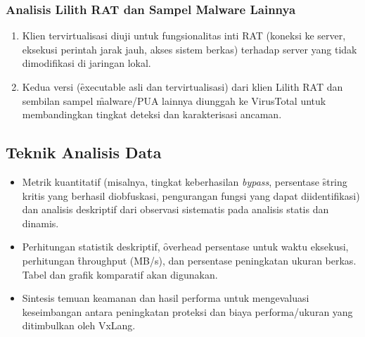 \subsubsection{Analisis Lilith RAT dan Sampel Malware Lainnya}
\begin{enumerate}
    \item {} Klien tervirtualisasi diuji untuk fungsionalitas inti RAT (koneksi ke server, eksekusi perintah jarak jauh, akses sistem berkas) terhadap server yang tidak dimodifikasi di jaringan lokal.
    \item {} Kedua versi (\f{executable} asli dan tervirtualisasi) dari klien Lilith RAT dan sembilan sampel \f{malware}/PUA lainnya diunggah ke VirusTotal untuk membandingkan tingkat deteksi dan karakterisasi ancaman.
\end{enumerate}

\subsection{Teknik Analisis Data}
\begin{itemize}
    \item {} Metrik kuantitatif (misalnya, tingkat keberhasilan \textit{bypass}, persentase \f{string} kritis yang berhasil diobfuskasi, pengurangan fungsi yang dapat diidentifikasi) dan analisis deskriptif dari observasi sistematis pada analisis statis dan dinamis.
    \item {} Perhitungan statistik deskriptif, \f{overhead} persentase untuk waktu eksekusi, perhitungan \f{throughput} (MB/s), dan persentase peningkatan ukuran berkas. Tabel dan grafik komparatif akan digunakan.
    \item {} Sintesis temuan keamanan dan hasil performa untuk mengevaluasi keseimbangan antara peningkatan proteksi dan biaya performa/ukuran yang ditimbulkan oleh VxLang.
\end{itemize}
